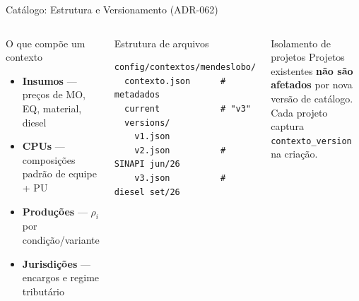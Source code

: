 \documentclass[aspectratio=169,10pt]{beamer}
\begin{document}
\begin{frame}{Catálogo: Estrutura e Versionamento (ADR-062)}
  \begin{columns}[T]
    \begin{block}{O que compõe um contexto}
      \begin{itemize}\scriptsize
        \item \textbf{Insumos} --- preços de MO, EQ, material, diesel
        \item \textbf{CPUs} --- composições padrão de equipe + PU
        \item \textbf{Produções} --- $\rho_i$ por condição/variante
        \item \textbf{Jurisdições} --- encargos e regime tributário
      \end{itemize}
    \end{block}
    \vspace{4pt}
    \begin{block}{Estrutura de arquivos}
      \begin{lstlisting}
config/contextos/mendeslobo/
  contexto.json      # metadados
  current            # "v3"
  versions/
    v1.json
    v2.json          # SINAPI jun/26
    v3.json          # diesel set/26
      \end{lstlisting}
    \end{block}
    \vspace{4pt}
    \begin{alertblock}{\small Isolamento de projetos}
      \scriptsize Projetos existentes \textbf{não são afetados} por nova versão
      de catálogo. Cada projeto captura \texttt{contexto\_version} na criação.
    \end{alertblock}


\end{columns}
\end{frame}
\end{document}
